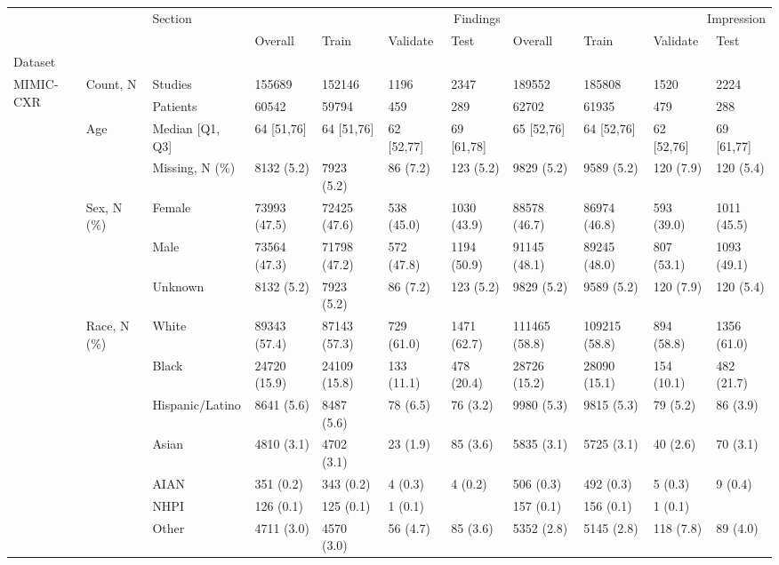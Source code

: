 \begin{tabular}{lllllllllll}
\toprule
 &  & Section & \multicolumn{4}{r}{Findings} & \multicolumn{4}{r}{Impression} \\
 &  &  & Overall & Train & Validate & Test & Overall & Train & Validate & Test \\
Dataset &  &  &  &  &  &  &  &  &  &  \\
\midrule
\multirow[c]{15}{*}{MIMIC-CXR} & \multirow[c]{2}{*}{Count, N} & Studies & 155689 & 152146 & 1196 & 2347 & 189552 & 185808 & 1520 & 2224 \\
 &  & Patients & 60542 & 59794 & 459 & 289 & 62702 & 61935 & 479 & 288 \\
\cmidrule(lr){2-11}
 & \multirow[c]{2}{*}{Age} & Median [Q1, Q3] & 64 [51,76] & 64 [51,76] & 62 [52,77] & 69 [61,78] & 65 [52,76] & 64 [52,76] & 62 [52,76] & 69 [61,77] \\
 &  & Missing, N (\%) & 8132 (5.2) & 7923 (5.2) & 86 (7.2) & 123 (5.2) & 9829 (5.2) & 9589 (5.2) & 120 (7.9) & 120 (5.4) \\
\cmidrule(lr){2-11}
 & \multirow[c]{3}{*}{Sex, N (\%)} & Female & 73993 (47.5) & 72425 (47.6) & 538 (45.0) & 1030 (43.9) & 88578 (46.7) & 86974 (46.8) & 593 (39.0) & 1011 (45.5) \\
 &  & Male & 73564 (47.3) & 71798 (47.2) & 572 (47.8) & 1194 (50.9) & 91145 (48.1) & 89245 (48.0) & 807 (53.1) & 1093 (49.1) \\
 &  & Unknown & 8132 (5.2) & 7923 (5.2) & 86 (7.2) & 123 (5.2) & 9829 (5.2) & 9589 (5.2) & 120 (7.9) & 120 (5.4) \\
\cmidrule(lr){2-11}
 & \multirow[c]{8}{*}{Race, N (\%)} & White & 89343 (57.4) & 87143 (57.3) & 729 (61.0) & 1471 (62.7) & 111465 (58.8) & 109215 (58.8) & 894 (58.8) & 1356 (61.0) \\
 &  & Black & 24720 (15.9) & 24109 (15.8) & 133 (11.1) & 478 (20.4) & 28726 (15.2) & 28090 (15.1) & 154 (10.1) & 482 (21.7) \\
 &  & Hispanic/Latino & 8641 (5.6) & 8487 (5.6) & 78 (6.5) & 76 (3.2) & 9980 (5.3) & 9815 (5.3) & 79 (5.2) & 86 (3.9) \\
 &  & Asian & 4810 (3.1) & 4702 (3.1) & 23 (1.9) & 85 (3.6) & 5835 (3.1) & 5725 (3.1) & 40 (2.6) & 70 (3.1) \\
 &  & AIAN & 351 (0.2) & 343 (0.2) & 4 (0.3) & 4 (0.2) & 506 (0.3) & 492 (0.3) & 5 (0.3) & 9 (0.4) \\
 &  & NHPI & 126 (0.1) & 125 (0.1) & 1 (0.1) &  & 157 (0.1) & 156 (0.1) & 1 (0.1) &  \\
 &  & Other & 4711 (3.0) & 4570 (3.0) & 56 (4.7) & 85 (3.6) & 5352 (2.8) & 5145 (2.8) & 118 (7.8) & 89 (4.0) \\

\end{tabular}
